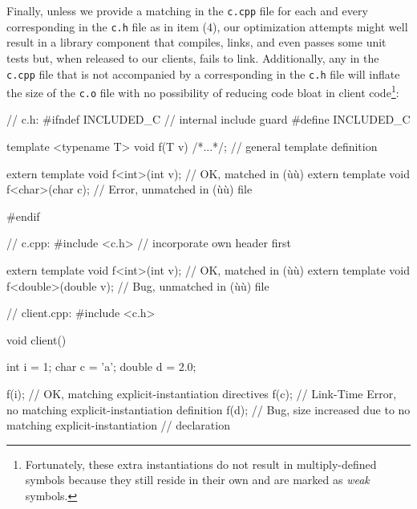 Finally, unless we provide a matching  in the \lstinline!c.cpp! file for each and every
corresponding  in the
\lstinline!c.h! file as in item (4), our optimization attempts might well
result in a library component that compiles, links, and even passes some
unit tests but, when released to our clients, fails to link.
Additionally, any  in
the \lstinline!c.cpp! file that is not accompanied by a corresponding
 in the \lstinline!c.h!
file will inflate the size of the \lstinline!c.o! file with no possibility
of reducing code bloat in client code{\cprotect\footnote{Fortunately,
these extra instantiations do not result in multiply-defined symbols
because they still reside in their own  and are marked
  as \emph{weak} symbols.}}:

\begin{emcppslisting}[emcppsbatch=e7]
// c.h:
#ifndef INCLUDED_C                            // internal include guard
#define INCLUDED_C

template <typename T> void f(T v) {/*...*/};  // general template definition

extern template void f<int>(int v);           // OK, matched in (ù{}ù)
extern template void f<char>(char c);         // Error, unmatched in (ù{}ù) file

#endif
\end{emcppslisting}
\vspace*{2ex}   %
\begin{emcppslisting}[emcppsbatch=e7]
// c.cpp:
#include <c.h>                                 // incorporate own header first

extern template void f<int>(int v);            // OK, matched in (ù{}ù)
extern template void f<double>(double v);      // Bug, unmatched in (ù{}ù) file
\end{emcppslisting}
\vspace*{2ex}   %
\begin{emcppslisting}[emcppsbatch=e7]
// client.cpp:
#include <c.h>

void client()
{
    int    i = 1;
    char   c = 'a';
    double d = 2.0;

    f(i);  // OK, matching explicit-instantiation directives
    f(c);  // Link-Time Error, no matching explicit-instantiation definition
    f(d);  // Bug, size increased due to no matching explicit-instantiation
           // declaration
}
\end{emcppslisting}

